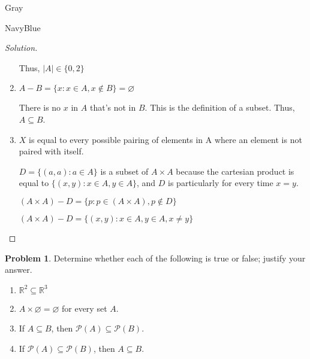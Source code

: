\documentclass[12pt]{amsart}
\newcounter{problem_number}[section]
\theoremstyle{named}
\newenvironment{soln}
{\begin{color}{Gray}\begin{framed}\begin{color}{NavyBlue}\begin{proof}[Solution]
\doublespacing}
{\end{proof}\end{color}\end{framed}\end{color}}
\theoremstyle{definition}
\newtheorem{problem}{Problem}
\newcommand{\R}{\mathbb R}
\begin{document}
\begin{soln}
\begin{enumerate}
        \noindent Thus, $|A| \in \{0,2\}$

        \phantom{ }

        \item $ A - B = \{x : x \in A, x \notin B\} = \varnothing$
        
        \noindent There is no $x$ in $A$ that's not in $B$. This is the definition of a
        subset. Thus, $A \subseteq B$. 

        \item $X$ is equal to every possible pairing of elements in A where an
        element is not paired with itself. 
        
        \noindent $D = \{(a,a) : a \in A\}$ is a subset of $A \times A$
        because the cartesian product is equal to $\{(x,y) : x \in A, y \in A\}$,
        and $D$ is particularly for every time $x = y$. 
        
        \noindent$(A \times A) - D = \{p : p \in (A \times A), p \notin D\}$

        \noindent$(A \times A) - D = \{(x,y) : x \in A, y \in A, x \neq y\}$
    \end{enumerate}
\end{soln}
\begin{problem}
	Determine whether each of the following is true or false; justify your answer.
	\begin{enumerate}
		\item $\R^2\subseteq\R^3$
		\item $A\times\varnothing = \varnothing$ for every set $A$.
		\item If $A\subseteq B$, then $\mathscr P(A)\subseteq\mathscr P(B)$.	
		\item If $\mathscr P(A)\subseteq\mathscr P(B)$, then $A\subseteq B$. 
	\end{enumerate}
	
\end{problem}
\end{document}
